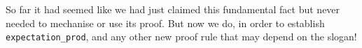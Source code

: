 So far it had seemed like we had just claimed this fundamental fact but never needed to mechanise or use its proof. But now we do,
in order to establish \texttt{expectation\_prod}, and any other new proof rule that may depend on the slogan!




